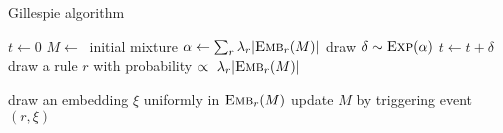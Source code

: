 \begin{algorithm}
\caption{Gillespie algorithm}\label{alg:gillespie}
\begin{spacing}{1.2}
\begin{algorithmic}
\vspace{0.2cm}
  \STATE $t \gets 0$
  \STATE $M \gets\ $ initial mixture
      \STATE $\alpha \gets \sum_r {\lambda_r |{\textsc{Emb}}_{r}(M)|}$
      \STATE draw $\delta \sim \textsc{Exp}(\alpha) $
      \STATE $t \gets t + \delta$
      \STATE draw a rule $r$ with probability
      $\propto \ \lambda_r |{\textsc{Emb}}_{r}(M)|$

      \STATE draw an embedding $\xi$ uniformly in ${\textsc{Emb}}_{r}(M)$
      \STATE update $M$ by triggering event $(r, \xi)$
  \ENDWHILE
\vspace{0.1cm}
\end{algorithmic}
\end{spacing}
\end{algorithm}
